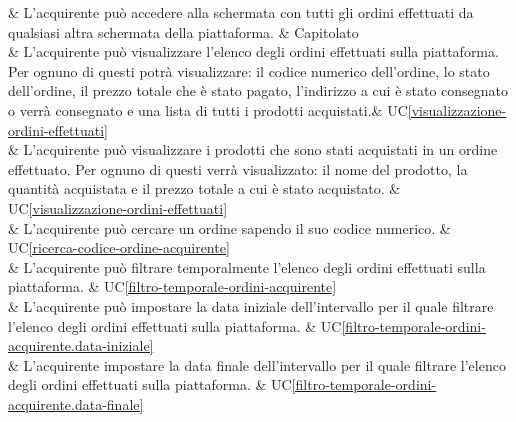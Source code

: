  & L'acquirente può accedere alla schermata con tutti gli ordini effettuati da qualsiasi altra schermata della piattaforma. & Capitolato \\

 & L'acquirente può visualizzare l'elenco degli ordini effettuati sulla piattaforma. Per ognuno di questi potrà visualizzare: il codice numerico dell'ordine, lo stato dell'ordine, il prezzo totale che è stato pagato, l'indirizzo a cui è stato consegnato o verrà consegnato e una lista di tutti i prodotti acquistati.& UC\ref{visualizzazione-ordini-effettuati} \\

 & L'acquirente può visualizzare i prodotti che sono stati acquistati in un ordine effettuato. Per ognuno di questi verrà visualizzato: il nome del prodotto, la quantità acquistata e il prezzo totale a cui è stato acquistato. & UC\ref{visualizzazione-ordini-effettuati} \\

 & L'acquirente può cercare un ordine sapendo il suo codice numerico. & UC\ref{ricerca-codice-ordine-acquirente} \\

 & L'acquirente può filtrare temporalmente l'elenco degli ordini effettuati sulla piattaforma. & UC\ref{filtro-temporale-ordini-acquirente} \\

 & L'acquirente può impostare la data iniziale dell'intervallo per il quale filtrare l'elenco degli ordini effettuati sulla piattaforma. & UC\ref{filtro-temporale-ordini-acquirente.data-iniziale} \\

 & L'acquirente impostare la data finale dell'intervallo per il quale filtrare l'elenco degli ordini effettuati sulla piattaforma. & UC\ref{filtro-temporale-ordini-acquirente.data-finale} \\

